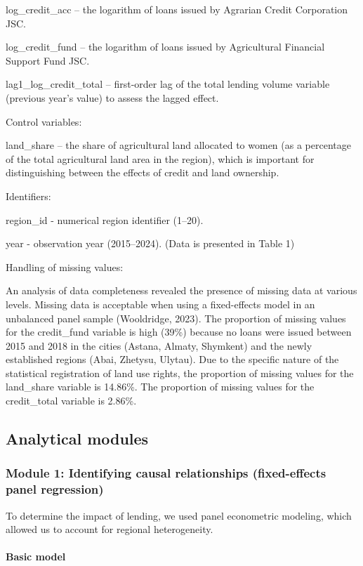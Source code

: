 ﻿\documentclass[sn-mathphys-num]{sn-jnl}
\newcommand{\hl}[1]{#1}
\begin{document}
log\_credit\_acc -- the logarithm of loans issued by Agrarian Credit
Corporation JSC.

log\_credit\_fund -- the logarithm of loans issued by Agricultural
Financial Support Fund JSC.

lag1\_log\_credit\_total -- first-order lag of the total lending volume
variable (previous year's value) to assess the lagged effect.

Control variables:

land\_share -- the share of agricultural land allocated to women (as a
percentage of the total agricultural land area in the region), which is
important for distinguishing between the effects of credit and land
ownership.

Identifiers:

region\_id - numerical region identifier (1--20).

year - observation year (2015--2024). (Data is presented in Table 1)

Handling of missing values:

An analysis of data completeness revealed the presence of missing data
at various levels. Missing data is acceptable when using a fixed-effects
model in an unbalanced panel sample (\hl{Wooldridge, 2023).} The
proportion of missing values for the credit\_fund variable is high
(39\%) because no loans were issued between 2015 and 2018 in the cities
(Astana, Almaty, Shymkent) and the newly established regions (Abai,
Zhetysu, Ulytau). Due to the specific nature of the statistical
registration of land use rights, the proportion of missing values for
the land\_share variable is 14.86\%. The proportion of missing values
for the credit\_total variable is 2.86\%.

\subsection{Analytical modules}

\subsubsection{Module 1: Identifying causal relationships (fixed-effects panel regression)}

To determine the impact of lending, we used panel econometric modeling,
which allowed us to account for regional heterogeneity.

\paragraph{Basic model}
\end{document}
